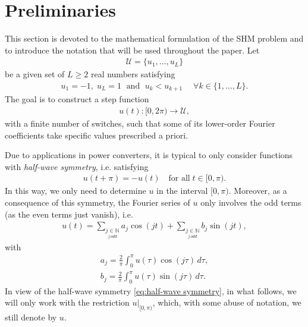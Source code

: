 \documentclass[twocolumn]{autart}    %
\begin{document}
\section{Preliminaries}\label{sec:math_formulation}

This section is devoted to the mathematical formulation of the SHM problem and to introduce the notation that will be used throughout the paper. Let 
\begin{align}\label{eq:Udef}
	\mathcal{U} = \{u_1, \ldots, u_L\}
\end{align}
be a given set of $L\geq 2$ real numbers satisfying
\begin{align*}
	u_1 = -1, \; u_L = 1 \;\text{ and } \; u_k<u_{k+1} \quad\; \forall k\in \{1,\ldots, L\}.
\end{align*}
The goal is to construct a step function
\begin{align*}
	u(t):[0,2\pi)\to\mathcal U,
\end{align*}
with a finite number of switches, such that some of its lower-order Fourier coefficients take specific values prescribed a priori.

Due to applications in power converters,  it is typical to only consider functions with \textit{half-wave symmetry}, i.e. satisfying
\begin{align}\label{eq:half-wave symmetry}
	u(t + \pi) = -u(t)\quad \mbox{for all}\; t \in [0,\pi).
\end{align}
In this way, we only need to determine $u$ in the interval $[0,\pi)$. Moreover, as a consequence of this symmetry, the Fourier series of $u$ only involves the odd terms (as the even terms just vanish), i.e.
\begin{align*}
	u(t) = \sum_{\underset{j\, odd}{j \in \mathbb{N}}} a_j \cos(jt)+ \sum_{\underset{j\, odd}{j \in \mathbb{N}}}  b_j \sin(jt),
\end{align*}
with
\begin{equation} \label{eq:an}
	\begin{aligned}
		a_j = \frac{2}{\pi} \int_0^\pi u(\tau ) \cos(j \tau)\,d\tau, 
		\\[5pt]
		b_j = \frac{2}{\pi} \int_0^\pi u(\tau)  \sin(j \tau)\,d\tau.
	\end{aligned}
\end{equation}
In view of the half-wave symmetry \eqref{eq:half-wave symmetry}, in what follows, we will only work with the restriction $u|_{[0,\pi)}$, which, with some abuse of notation, we still denote by $u$. 
\end{document}
